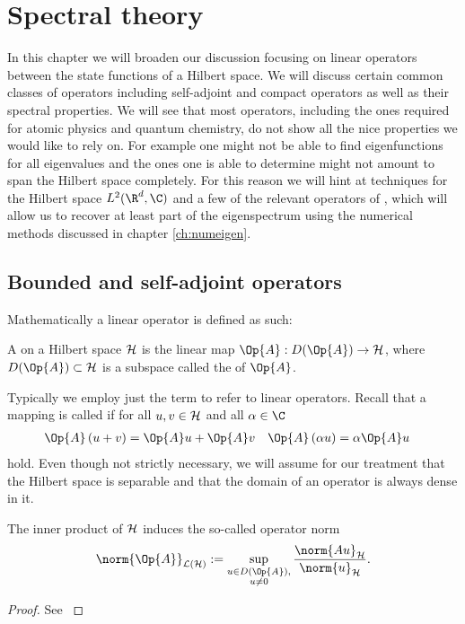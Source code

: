 \section{Spectral theory}
\label{sec:spectral}

In this chapter we will broaden our discussion focusing
on linear operators between the state functions of a Hilbert space.
We will discuss certain common classes of operators
including self-adjoint and compact operators as well as their spectral properties.
We will see that most operators, including the ones required for
atomic physics and quantum chemistry,
do not show all the nice properties we would like to rely on.
For example one might not be able to find eigenfunctions
for all eigenvalues and the ones one is able to determine
might not amount to span the Hilbert space completely.
For this reason we will hint at techniques for the Hilbert space
$L^2(\R^d, \C)$ and a few of the relevant operators of \QM,
which will allow us to recover at least part of the eigenspectrum
using the numerical methods discussed in chapter \vref{ch:numeigen}.

\subsection{Bounded and self-adjoint operators}

Mathematically a linear operator is defined as such:
\begin{defn}
	A  on a Hilbert space $\mathcal{H}$
	is the linear map $\Op{A} : D(\Op{A}) \to \hilbert$,
	where $D(\Op{A}) \subset \hilbert$ is a subspace
	called the  of $\Op{A}$.
\end{defn}
Typically we employ just the term  to refer to linear operators.
Recall that a mapping is called  if
for all $u, v \in \mathcal{H}$ and all $\alpha \in \C$
\begin{align}
	\label{eqn:OperatorLinear}
	\Op{A}\left(u + v\right) &= \Op{A}u + \Op{A}v &
	\Op{A}\left(\alpha u\right) &= \alpha \Op{A}u
\end{align}
hold.
Even though not strictly necessary, we will assume for our treatment
that the Hilbert space is separable and that the domain of an operator
is always dense in it.

\newcommand{\opnorm}[1]{\norm{#1}_{\mathcal{L}(\hilbert)}}
\begin{prop}
	The inner product of $\mathcal{H}$ induces the so-called operator norm
	\[ \opnorm{\Op{A}} := \sup_{\substack{u \in D(\Op{A}),\\ u\neq0}}
		\frac{\norm{A u}_\hilbert}{\norm{u}_{\hilbert}}. \]
	\begin{proof}
		See \cite[Satz II.1.4]{Werner2011}
	\end{proof}
\end{prop}

